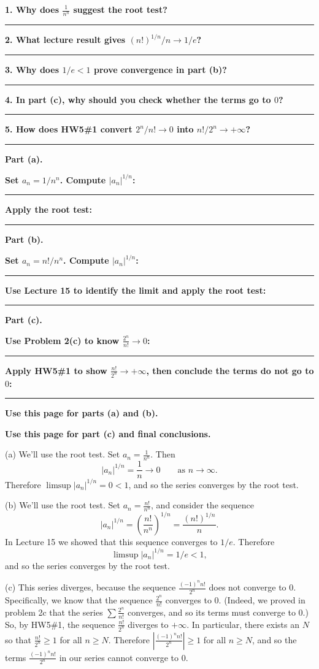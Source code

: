 \documentclass[12pt]{article}
\newcommand{\writespace}[1]{\vspace*{#1}}
\newcommand{\workquestion}[2]{%
  \par\noindent\textbf{#1}\par
  \writespace{#2}
  \noindent\rule{\linewidth}{0.35pt}\par\vspace{0.18in}%
}
\newenvironment{selfexplanationbox}[1]{%
  \begin{tcolorbox}[
    enhanced,
    colback=pass3orange,
    colframe=orange!65!black,
    fonttitle=\bfseries,
    title={Pass 3 -- Self-Explanation\hfill #1},
    height=8.45in
  ]
}{%
  \end{tcolorbox}
}
\newenvironment{skeletonbox}[1]{%
  \begin{tcolorbox}[
    enhanced,
    breakable,
    colback=pass4purple,
    colframe=purple!55!black,
    fonttitle=\bfseries,
    title={Pass 4 -- Skeleton Proof\hfill #1}
  ]
}{%
  \end{tcolorbox}
}
\newcommand{\fullproofpage}[2]{%
  \begin{tcolorbox}[
    enhanced,
    colback=white,
    colframe=gray!60!black,
    fonttitle=\bfseries,
    title={Pass 5 -- Full Proof Attempt\hfill #1},
    height=8.45in
  ]
  \textbf{#2}

  \writespace{7.65in}
  \end{tcolorbox}
}
\newenvironment{solutionbox}[1]{%
  \begin{tcolorbox}[
    enhanced,
    breakable,
    colback=solgreen,
    colframe=green!45!black,
    fonttitle=\bfseries,
    title={#1}
  ]
}{%
  \end{tcolorbox}
}
\begin{document}
\newpage
\begin{selfexplanationbox}{Homework 7, Problem 3}
\workquestion{1. Why does \(\frac1{n^n}\) suggest the root test?}{0.9in}
\workquestion{2. What lecture result gives \((n!)^{1/n}/n\to 1/e\)?}{0.95in}
\workquestion{3. Why does \(1/e<1\) prove convergence in part (b)?}{0.9in}
\workquestion{4. In part (c), why should you check whether the terms go to \(0\)?}{0.95in}
\workquestion{5. How does HW5\#1 convert \(2^n/n!\to0\) into \(n!/2^n\to+\infty\)?}{1.0in}
\end{selfexplanationbox}

\newpage
\begin{skeletonbox}{Homework 7, Problem 3}
\textbf{Part (a).}
\workquestion{Set \(a_n=1/n^n\). Compute \(|a_n|^{1/n}\):}{0.9in}
\workquestion{Apply the root test:}{0.75in}

\textbf{Part (b).}
\workquestion{Set \(a_n=n!/n^n\). Compute \(|a_n|^{1/n}\):}{0.9in}
\workquestion{Use Lecture 15 to identify the limit and apply the root test:}{0.95in}

\textbf{Part (c).}
\workquestion{Use Problem 2(c) to know \(\frac{2^n}{n!}\to0\):}{0.85in}
\workquestion{Apply HW5\#1 to show \(\frac{n!}{2^n}\to+\infty\), then conclude the terms do not go to \(0\):}{1.0in}
\end{skeletonbox}

\newpage
\fullproofpage{Homework 7, Problem 3}{Use this page for parts (a) and (b).}

\newpage
\fullproofpage{Homework 7, Problem 3}{Use this page for part (c) and final conclusions.}

\newpage
\begin{solutionbox}{Official Solution (Professor)}
(a) We'll use the root test. Set \(a_n=\frac1{n^n}\). Then
\[
  |a_n|^{1/n}=\frac1n \longrightarrow 0
  \qquad \text{as } n\to\infty.
\]
Therefore \(\limsup |a_n|^{1/n}=0<1\), and so the series converges by the root test.

(b) We'll use the root test. Set \(a_n=\frac{n!}{n^n}\), and consider the sequence
\[
  |a_n|^{1/n}
  =
  \left(\frac{n!}{n^n}\right)^{1/n}
  =
  \frac{(n!)^{1/n}}{n}.
\]
In Lecture 15 we showed that this sequence converges to \(1/e\). Therefore
\[
  \limsup |a_n|^{1/n}=1/e<1,
\]
and so the series converges by the root test.

(c) This series diverges, because the sequence \(\frac{(-1)^n n!}{2^n}\) does not converge to \(0\). Specifically, we know that the sequence \(\frac{2^n}{n!}\) converges to \(0\). (Indeed, we proved in problem 2c that the series \(\sum\frac{2^n}{n!}\) converges, and so its terms must converge to \(0\).) So, by HW5\#1, the sequence \(\frac{n!}{2^n}\) diverges to \(+\infty\). In particular, there exists an \(N\) so that \(\frac{n!}{2^n}\ge1\) for all \(n\ge N\). Therefore \(\left|\frac{(-1)^n n!}{2^n}\right|\ge1\) for all \(n\ge N\), and so the terms \(\frac{(-1)^n n!}{2^n}\) in our series cannot converge to \(0\).
\end{solutionbox}
\end{document}
